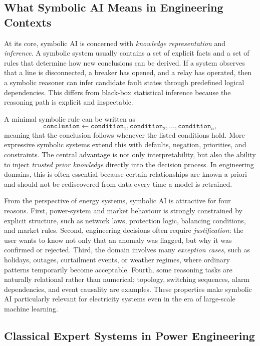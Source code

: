 \subsection{What Symbolic AI Means in Engineering Contexts}

At its core, symbolic AI is concerned with \emph{knowledge representation} and \emph{inference}. A symbolic system usually contains a set of explicit facts and a set of rules that determine how new conclusions can be derived. If a system observes that a line is disconnected, a breaker has opened, and a relay has operated, then a symbolic reasoner can infer candidate fault states through predefined logical dependencies. This differs from black-box statistical inference because the reasoning path is explicit and inspectable.

A minimal symbolic rule can be written as
\begin{equation}
	\texttt{conclusion} \leftarrow \texttt{condition}_1,\texttt{condition}_2,\dots,\texttt{condition}_n,
	\label{eq:ch32_symbolic_rule}
\end{equation}
meaning that the conclusion follows whenever the listed conditions hold. More expressive symbolic systems extend this with defaults, negation, priorities, and constraints. The central advantage is not only interpretability, but also the ability to inject \emph{trusted prior knowledge} directly into the decision process. In engineering domains, this is often essential because certain relationships are known a priori and should not be rediscovered from data every time a model is retrained.

From the perspective of energy systems, symbolic AI is attractive for four reasons. First, power-system and market behaviour is strongly constrained by explicit structure, such as network laws, protection logic, balancing conditions, and market rules. Second, engineering decisions often require \emph{justification}: the user wants to know not only that an anomaly was flagged, but why it was confirmed or rejected. Third, the domain involves many \emph{exception cases}, such as holidays, outages, curtailment events, or weather regimes, where ordinary patterns temporarily become acceptable. Fourth, some reasoning tasks are naturally relational rather than numerical; topology, switching sequences, alarm dependencies, and event causality are examples. These properties make symbolic AI particularly relevant for electricity systems even in the era of large-scale machine learning.

\subsection{Classical Expert Systems in Power Engineering}


